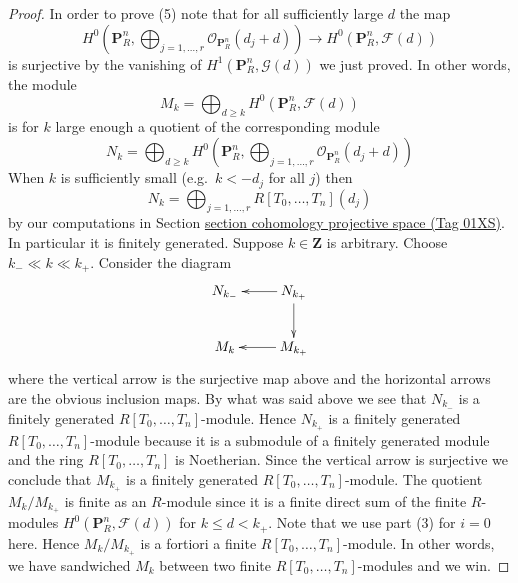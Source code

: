 \documentclass{amsart}
\theoremstyle{plain}
\theoremstyle{definition}
\theoremstyle{remark}
\numberwithin{equation}{subsection}
\begin{document}
\begin{proof}
\medskip\noindent
In order to prove (5) note that for all sufficiently large $d$
the map
$$
H^0(\mathbf{P}^n_R, \bigoplus\nolimits_{j = 1, \ldots, r}
\mathcal{O}_{\mathbf{P}^n_R}(d_j + d))
\to
H^0(\mathbf{P}^n_R, \mathcal{F}(d))
$$
is surjective by the vanishing of $H^1(\mathbf{P}^n_R, \mathcal{G}(d))$
we just proved. In other words, the module
$$
M_k
=
\bigoplus\nolimits_{d \geq k} H^0(\mathbf{P}^n_R, \mathcal{F}(d))
$$
is for $k$ large enough a quotient of the corresponding module
$$
N_k
=
\bigoplus\nolimits_{d \geq k} H^0(\mathbf{P}^n_R,
\bigoplus\nolimits_{j = 1, \ldots, r}
\mathcal{O}_{\mathbf{P}^n_R}(d_j + d)
)
$$
When $k$ is sufficiently small (e.g.\ $k < -d_j$ for all $j$) then
$$
N_k = \bigoplus\nolimits_{j = 1, \ldots, r}
R[T_0, \ldots, T_n](d_j)
$$
by our computations in Section \href{https://stacks.math.columbia.edu/tag/01XS}{section cohomology projective space (Tag 01XS)}.
In particular it is finitely generated.
Suppose $k \in \mathbf{Z}$ is arbitrary.
Choose $k_{-} \ll k \ll k_{+}$.
Consider the diagram
$$
\xymatrix{
N_{k_{-}} & N_{k_{+}} \ar[d] \ar[l] \\
M_k & M_{k_{+}} \ar[l]
}
$$
where the vertical arrow is the surjective map above and
the horizontal arrows are the obvious inclusion maps.
By what was said above we see that $N_{k_{-}}$ is a finitely
generated $R[T_0, \ldots, T_n]$-module. Hence $N_{k_{+}}$ is
a finitely generated $R[T_0, \ldots, T_n]$-module because it
is a submodule of a finitely generated module and the ring
$R[T_0, \ldots, T_n]$ is Noetherian. Since the vertical arrow
is surjective we conclude that $M_{k_{+}}$ is a finitely
generated $R[T_0, \ldots, T_n]$-module. The quotient
$M_k/M_{k_{+}}$ is finite as an $R$-module since it is a
finite direct sum of the finite $R$-modules
$H^0(\mathbf{P}^n_R, \mathcal{F}(d))$ for $k \leq d < k_{+}$.
Note that we use part (3) for $i = 0$ here. Hence
$M_k/M_{k_{+}}$ is a fortiori a finite $R[T_0, \ldots, T_n]$-module.
In other words, we have sandwiched $M_k$ between two finite
$R[T_0, \ldots, T_n]$-modules and we win.
\end{proof}
\end{document}
